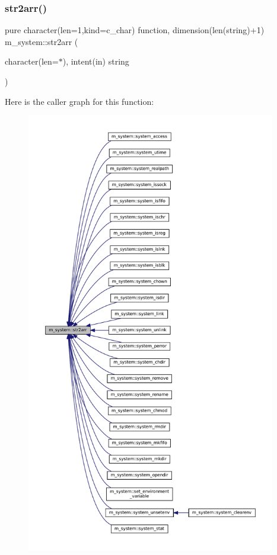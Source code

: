 \subsubsection{\texorpdfstring{str2arr()}{str2arr()}}
{\footnotesize\ttfamily pure character(len=1,kind=c\+\_\+char) function, dimension(len(string)+1) m\+\_\+system\+::str2arr (\begin{DoxyParamCaption}\item[{character(len=$\ast$), intent(in)}]{string }\end{DoxyParamCaption})\hspace{0.3cm}{\ttfamily [private]}}

Here is the caller graph for this function\+:
\nopagebreak
\begin{figure}[H]
\begin{center}
\leavevmode
\includegraphics[height=550pt]{namespacem__system_af7e778ffc24aa7bc00b842a8e673aeaa_icgraph}
\end{center}
\end{figure}
\mbox{\label{namespacem__system_a4687a363acbb7084a51bc77844789275}} 
